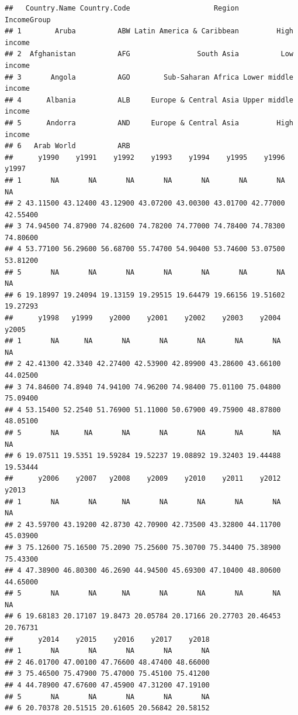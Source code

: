 \documentclass[
]{book}
\begin{document}
\begin{verbatim}
##   Country.Name Country.Code                    Region         IncomeGroup
## 1        Aruba          ABW Latin America & Caribbean         High income
## 2  Afghanistan          AFG                South Asia          Low income
## 3       Angola          AGO        Sub-Saharan Africa Lower middle income
## 4      Albania          ALB     Europe & Central Asia Upper middle income
## 5      Andorra          AND     Europe & Central Asia         High income
## 6   Arab World          ARB                                              
##      y1990    y1991    y1992    y1993    y1994    y1995    y1996    y1997
## 1       NA       NA       NA       NA       NA       NA       NA       NA
## 2 43.11500 43.12400 43.12900 43.07200 43.00300 43.01700 42.77000 42.55400
## 3 74.94500 74.87900 74.82600 74.78200 74.77000 74.78400 74.78300 74.80600
## 4 53.77100 56.29600 56.68700 55.74700 54.90400 53.74600 53.07500 53.81200
## 5       NA       NA       NA       NA       NA       NA       NA       NA
## 6 19.18997 19.24094 19.13159 19.29515 19.64479 19.66156 19.51602 19.27293
##      y1998   y1999    y2000    y2001    y2002    y2003    y2004    y2005
## 1       NA      NA       NA       NA       NA       NA       NA       NA
## 2 42.41300 42.3340 42.27400 42.53900 42.89900 43.28600 43.66100 44.02500
## 3 74.84600 74.8940 74.94100 74.96200 74.98400 75.01100 75.04800 75.09400
## 4 53.15400 52.2540 51.76900 51.11000 50.67900 49.75900 48.87800 48.05100
## 5       NA      NA       NA       NA       NA       NA       NA       NA
## 6 19.07511 19.5351 19.59284 19.52237 19.08892 19.32403 19.44488 19.53444
##      y2006    y2007   y2008    y2009    y2010    y2011    y2012    y2013
## 1       NA       NA      NA       NA       NA       NA       NA       NA
## 2 43.59700 43.19200 42.8730 42.70900 42.73500 43.32800 44.11700 45.03900
## 3 75.12600 75.16500 75.2090 75.25600 75.30700 75.34400 75.38900 75.43300
## 4 47.38900 46.80300 46.2690 44.94500 45.69300 47.10400 48.80600 44.65000
## 5       NA       NA      NA       NA       NA       NA       NA       NA
## 6 19.68183 20.17107 19.8473 20.05784 20.17166 20.27703 20.46453 20.76731
##      y2014    y2015    y2016    y2017    y2018
## 1       NA       NA       NA       NA       NA
## 2 46.01700 47.00100 47.76600 48.47400 48.66000
## 3 75.46500 75.47900 75.47000 75.45100 75.41200
## 4 44.78900 47.67600 47.45900 47.31200 47.19100
## 5       NA       NA       NA       NA       NA
## 6 20.70378 20.51515 20.61605 20.56842 20.58152
\end{verbatim}
\end{document}
